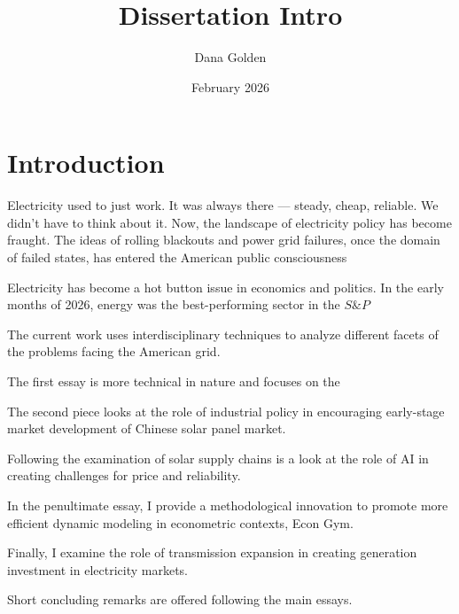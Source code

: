 \documentclass{article}
\title{Dissertation Intro}
\author{Dana Golden}
\date{February 2026}
\begin{document}
\maketitle

\section{Introduction}

Electricity used to just work. It was always there — steady, cheap, reliable. We didn't have to think about it. Now, the landscape of electricity policy has become fraught. The ideas of rolling blackouts and power grid failures, once the domain of failed states, has entered the American public consciousness

Electricity has become a hot button issue in economics and politics. In the early months of 2026, energy was the best-performing sector in the $S\&P$

The current work uses interdisciplinary techniques to analyze different facets of the problems facing the American grid.

The first essay is more technical in nature and focuses on the 

The second piece looks at the role of industrial policy in encouraging early-stage market development of Chinese solar panel market.

Following the examination of solar supply chains is a look at the role of AI in creating challenges for price and reliability.

In the penultimate essay, I provide a methodological innovation to promote more efficient dynamic modeling in econometric contexts, Econ Gym.

Finally, I examine the role of transmission expansion in creating generation investment in electricity markets.

Short concluding remarks are offered following the main essays.
\end{document}
